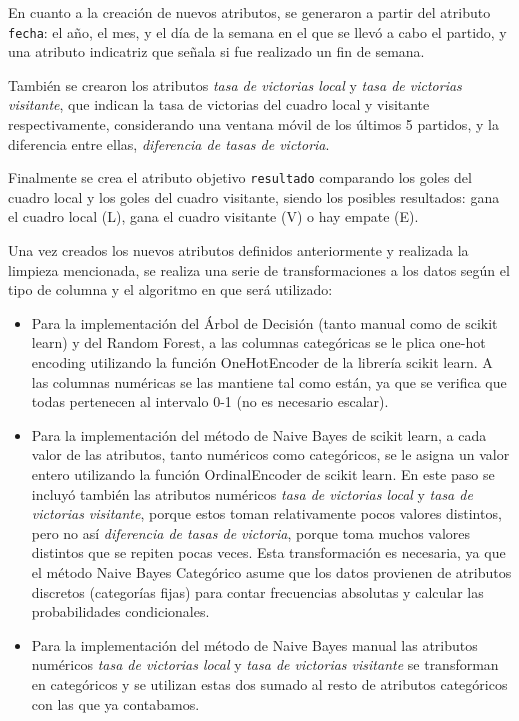 \documentclass[conference]{IEEEtran}
\begin{document}
En cuanto a la creación de nuevos atributos, se generaron a partir del atributo \texttt{fecha}: el año, el mes, y el día de la semana en el que se llevó a cabo el partido, y una atributo indicatriz que señala si fue realizado un fin de semana.

También se crearon los atributos \textit{tasa de victorias local} y \textit{tasa de victorias visitante}, que indican la tasa de victorias del cuadro local y visitante respectivamente, considerando una ventana móvil de los últimos 5 partidos, y la diferencia entre ellas, \textit{diferencia de tasas de victoria}.

Finalmente se crea el atributo objetivo \texttt{resultado} comparando los goles del cuadro local y los goles del cuadro visitante, siendo los posibles resultados: gana el cuadro local (L), gana el cuadro visitante (V) o hay empate (E).

Una vez creados los nuevos atributos definidos anteriormente y realizada la limpieza mencionada, se realiza una serie de transformaciones a los datos según el tipo de columna y el algoritmo en que será utilizado:

\begin{itemize}
\item Para la implementación del Árbol de Decisión (tanto manual como de scikit learn) y del Random Forest, a las columnas categóricas se le plica one-hot encoding utilizando la función OneHotEncoder de la librería scikit learn. A las columnas numéricas se las mantiene tal como están, ya que se verifica que todas pertenecen al intervalo 0-1 (no es necesario escalar).
\item Para la implementación del método de Naive Bayes de scikit learn, a cada valor de las atributos, tanto numéricos como categóricos, se le asigna un valor entero utilizando la función OrdinalEncoder de scikit learn. En este paso se incluyó también las atributos numéricos \textit{tasa de victorias local} y \textit{tasa de victorias visitante}, porque estos toman relativamente pocos valores distintos, pero no así \textit{diferencia de tasas de victoria}, porque toma muchos valores distintos que se repiten pocas veces. Esta transformación es necesaria, ya que el método Naive Bayes Categórico asume que los datos provienen de atributos discretos (categorías fijas) para contar frecuencias absolutas y calcular las probabilidades condicionales.
\item Para la implementación del método de Naive Bayes manual las atributos numéricos \textit{tasa de victorias local} y \textit{tasa de victorias visitante} se transforman en categóricos y se utilizan estas dos sumado al resto de atributos categóricos con las que ya contabamos.
\end{itemize}
\end{document}
